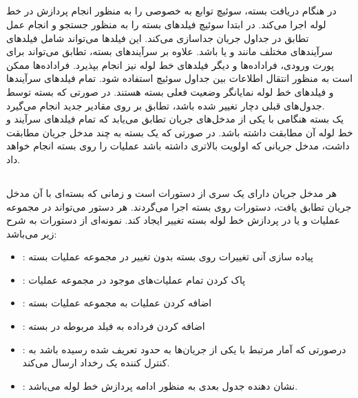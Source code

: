 \subsection{}
در هنگام دریافت بسته، سوئیچ توابع به خصوصی را به منظور انجام پردازش در خط لوله اجرا می‌کند. در ابتدا سوئیچ فیلد‌های بسته را به منظور جستجو و انجام عمل تطابق در جداول جریان جداسازی می‌کند. این فیلد‌ها می‌تواند شامل فیلد‌های سرآیند‌های مختلف مانند  و یا  باشد. علاوه بر سرآیند‌های بسته، تطابق می‌تواند برای پورت ورودی، فراداده‌ها و دیگر فیلد‌های خط لوله نیز انجام بپذیرد. فراداده‌ها ممکن است به منظور انتقال اطلاعات بین جداول سوئیچ استفاده شود. تمام فیلد‌های سرآیند‌ها و فیلد‌های خط لوله نمایانگر وضعیت فعلی بسته هستند. در صورتی که بسته توسط جدول‌های قبلی دچار تغییر شده باشد، تطابق بر روی مقادیر جدید انجام می‌گیرد.\\
یک بسته هنگامی با یکی از مدخل‌های جریان تطابق می‌یابد که تمام فیلد‌های سرآیند و خط لوله آن مطابقت داشته باشد. در صورتی که یک بسته به چند مدخل جریان مطابقت داشت، مدخل جریانی که اولویت بالاتری داشته باشد عملیات را روی بسته انجام خواهد داد.

\subsection{}
هر مدخل جریان دارای یک سری از دستورات است و زمانی که بسته‌ای با آن مدخل جریان تطابق یافت، دستورات روی بسته اجرا می‌گردند. هر دستور می‌تواند در مجموعه عملیات و یا در پردازش خط لوله بسته تغییر ایجاد کند. نمونه‌ای از دستورات به شرح زیر می‌باشد:
\begin{itemize}
	\item {}:
پیاده سازی آنی تغییرات روی بسته بدون تغییر در مجموعه عملیات بسته
	\item {}:
پاک کردن تمام عملیات‌های موجود در مجموعه عملیات
	\item {}:
اضافه کردن عملیات به مجموعه عملیات بسته
	\item {}:
اضافه کردن فرداده به فیلد مربوطه در بسته
	\item {}:
درصورتی که آمار مرتبط با یکی از جریان‌ها به حدود تعریف شده رسیده باشد به کنترل کننده یک رخداد ارسال می‌کند.
	\item {}:
نشان دهنده جدول بعدی به منظور ادامه پردازش خط لوله می‌باشد.
\end{itemize}

